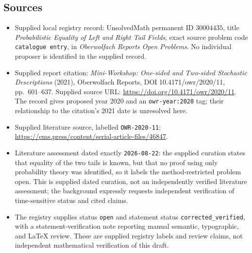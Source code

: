 \documentclass[11pt]{article}
\begin{document}
\subsection{Sources}
\begin{itemize}
\item Supplied local registry record: UnsolvedMath permanent ID \(30004435\), title \emph{Probabilistic Equality of Left and Right Tail Fields}, exact source problem code \texttt{catalogue entry}, in \emph{Oberwolfach Reports Open Problems}. No individual proposer is identified in the supplied record.
\item Supplied report citation: \emph{Mini-Workshop: One-sided and Two-sided Stochastic Descriptions} (2021), Oberwolfach Reports, DOI 10.4171/owr/2020/11, pp.\ 601--637. Supplied source URL: \url{https://doi.org/10.4171/owr/2020/11}. The record gives proposed year 2020 and an \texttt{owr-year:2020} tag; their relationship to the citation's 2021 date is unresolved here.
\item Supplied literature source, labelled \texttt{OWR-2020-11}: \url{https://ems.press/content/serial-article-files/46847}.
\item Literature assessment dated exactly \texttt{2026-08-22}: the supplied curation states that equality of the two tails is known, but that no proof using only probability theory was identified, so it labels the method-restricted problem open. This is supplied dated curation, not an independently verified literature assessment; the background expressly requests independent verification of time-sensitive status and cited claims.
\item The registry supplies status \texttt{open} and statement status \texttt{corrected\_verified}, with a statement-verification note reporting manual semantic, typographic, and LaTeX review. These are supplied registry labels and review claims, not independent mathematical verification of this draft.
\end{itemize}
\end{document}
